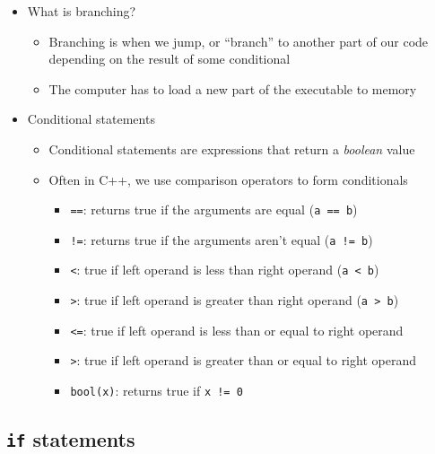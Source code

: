 \documentclass{article}
\begin{document}
\begin{itemize}
	\item What is branching?
	\begin{itemize}
		\item Branching is when we jump, or ``branch'' to another part of our code depending on the result of some conditional
		\item The computer has to load a new part of the executable to memory
	\end{itemize}
	\item Conditional statements
	\begin{itemize}
		\item Conditional statements are expressions that return a \textit{boolean} value
		\item Often in C++, we use comparison operators to form conditionals
		\begin{itemize}
			\item \texttt{==}: returns true if the arguments are equal (\texttt{a == b})
			\item \texttt{!=}: returns true if the arguments aren't equal (\texttt{a != b})
			\item \texttt{<}: true if left operand is less than right operand (\texttt{a < b})
			\item \texttt{>}: true if left operand is greater than right operand	 (\texttt{a > b})
			\item \texttt{<=}: true if left operand is less than or equal to right operand
			\item \texttt{>}: true if left operand is greater than or equal to right operand	
			\item \texttt{bool(x)}: returns true if \texttt{x != 0}
		\end{itemize}
		
	\end{itemize}
\end{itemize}

\subsection{\texttt{if} statements}
\end{document}
